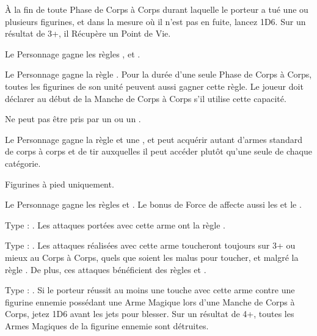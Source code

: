 \begin{multicols}{2}
À la fin de toute Phase de Corps à Corps durant laquelle le porteur a tué une ou plusieurs figurines, et dans la mesure où il n'est pas en fuite, lancez 1D6. Sur un résultat de 3+, il Récupère un Point de Vie.

Le Personnage gagne les règles , \stupidity{} et .

Le Personnage gagne la règle \poisonedattacks{}. Pour la durée d'une seule Phase de Corps à Corps, toutes les figurines de son unité peuvent aussi gagner cette règle. Le joueur doit déclarer au début de la Manche de Corps à Corps s'il utilise cette capacité.

Ne peut pas être pris par un \wizard{} ou un \mammothhunter{}.

Le Personnage gagne la règle \weaponmaster{} et une \platearmour{}, et peut acquérir autant d'armes standard de corps à corps et de tir auxquelles il peut accéder plutôt qu'une seule de chaque catégorie.

Figurines à pied uniquement.

Le Personnage gagne les règles \devastatingcharge{} et \thunderouscharge{}. Le bonus de Force de \thunderouscharge{} affecte aussi les \impacthits{} et le \stomp{}.

\endpricelistNSP
\end{multicols}

\closearmynewsection

\startarmymagicalitems

\armymagicalweapons

\startpricelist

Type : \gw{}. Les attaques portées avec cette arme ont la règle .

Type : \ironfist{}. Les attaques réalisées avec cette arme toucheront toujours sur 3+ ou mieux au Corps à Corps, quels que soient les malus pour toucher, et malgré la règle \parry{}. De plus, ces attaques bénéficient des règles  et .

Type : \ironfist{}. Si le porteur réussit au moins une touche avec cette arme contre une figurine ennemie possédant une Arme Magique lors d'une Manche de Corps à Corps, jetez 1D6 avant les jets pour blesser. Sur un résultat de 4+, toutes les Armes Magiques de la figurine ennemie sont détruites.


